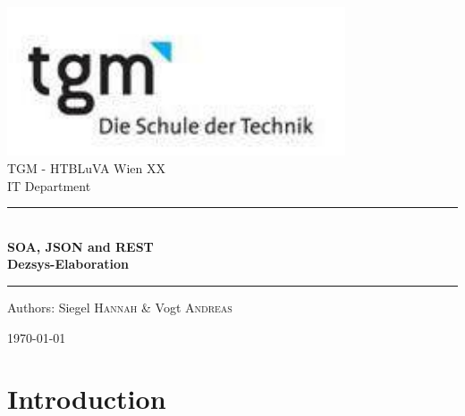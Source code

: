 \documentclass[10pt]{article}
\begin{document}
\begin{titlepage}
\begin{center}
\includegraphics[width=0.75\textwidth]{images/logo}\\[1cm]    



\LARGE TGM - HTBLuVA Wien XX \\ IT Department  \\[1.5cm]

\rule{1.0\textwidth}{1mm}
{ \huge \bfseries \\[0.4cm]  \huge SOA, JSON and REST \\ \LARGE Dezsys-Elaboration \\[0.4cm] }

\rule{1.0\textwidth}{1mm}


\noindent 
\vspace{5cm}

\begin{center}
\large
Authors: 
Siegel \textsc{Hannah} \&
Vogt \textsc{Andreas}
\end{center}

\vfill

{\large \today}

\end{center}
\end{titlepage}

\tableofcontents


\ohead{\headmark}

\newpage

\section{Introduction}
\end{document}
